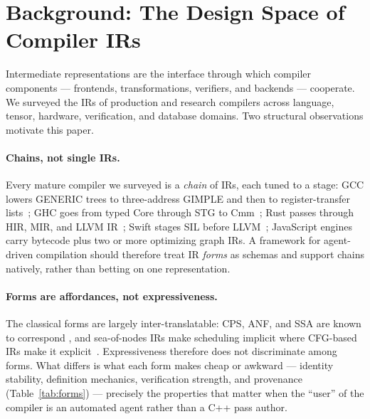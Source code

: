 \section{Background: The Design Space of Compiler IRs}
\label{sec:background}

Intermediate representations are the interface through which compiler components —
frontends, transformations, verifiers, and backends — cooperate. We surveyed the IRs
of production and research compilers across language, tensor, hardware, verification,
and database domains. Two structural observations motivate this paper.

\paragraph{Chains, not single IRs.} Every mature compiler we surveyed is a
\emph{chain} of IRs, each tuned to a stage: GCC lowers GENERIC trees to three-address
GIMPLE and then to register-transfer lists~\cite{merrill2003gimple}; GHC goes from
typed Core through STG to Cmm~\cite{peytonjones1992stg}; Rust passes through HIR, MIR,
and LLVM IR~\cite{mir}; Swift stages SIL before LLVM~\cite{swiftsil}; JavaScript
engines carry bytecode plus two or more optimizing graph IRs. A framework for
agent-driven compilation should therefore treat IR \emph{forms} as schemas and support
chains natively, rather than betting on one representation.

\paragraph{Forms are affordances, not expressiveness.} The classical forms are
largely inter-translatable: CPS, ANF, and SSA are known to correspond
\cite{kelsey1995ssa, appel1998ssa}, and sea-of-nodes IRs make scheduling implicit
where CFG-based IRs make it explicit~\cite{click1995sea, wurthinger2017graal}.
Expressiveness therefore does not discriminate among forms. What differs is what each
form makes cheap or awkward — identity stability, definition mechanics, verification
strength, and provenance (Table~\ref{tab:forms}) — precisely the properties that
matter when the ``user'' of the compiler is an automated agent rather than a C++ pass
author.

